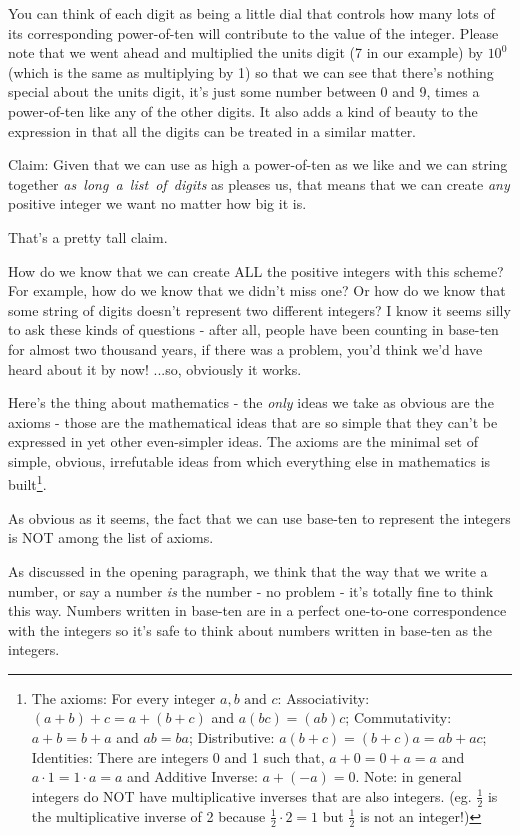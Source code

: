 \documentclass{article}
\begin{document}
You can think of each digit as being a little dial that controls how many lots
of its corresponding power-of-ten will contribute to the value of the integer. Please note
that we went ahead and multiplied the units digit (7 in our example) by $10^0$ (which is the
same as multiplying by 1) so that we can see that there's nothing special about the units digit,
it's just some number between 0 and 9, times a power-of-ten like any of the other digits.
It also adds a kind of beauty to the expression in that all
the digits can be treated in a similar matter.

Claim: Given that we can use as high a power-of-ten as we like
and we can string together \emph{as~long~a~list~of~digits} as pleases us,
that means that we can create \emph{any} positive integer we want no matter how big it is.

That's a pretty tall claim.

How do we know that we can create ALL the positive
integers with this scheme? For example,
how do we know that we didn't miss one? Or how do we know that some string of
digits doesn't represent two different integers? I know it seems silly to ask these kinds of questions - 
after all, people have been counting in base-ten for almost two thousand years,
if there was a problem, you'd think we'd have heard about it by now! ...so, obviously it works.

Here's the thing about mathematics - the \emph{only} ideas we take as obvious
are the axioms - those are the mathematical ideas that are so simple that they can't be expressed in
yet other even-simpler ideas. The axioms are the minimal set of simple, obvious, irrefutable ideas from which
everything else in mathematics is built\footnote{The axioms: For every integer $a,b\text{ and }c$:
Associativity: $(a+b)+c=a+(b+c)$ and $a(bc)=(ab)c$;
Commutativity: $a+b=b+a$ and $ab=ba$;
Distributive: $a(b+c)=(b+c)a=ab+ac$;
Identities: There are integers 0 and 1 such that, $a+0=0+a=a$ and $a\cdot{}1=1\cdot{}a=a$ and
Additive Inverse: $a+(-a)=0$. Note: in general integers do NOT have multiplicative inverses 
that are also integers. (eg. $\frac{1}{2}$ is the multiplicative inverse of 2 because $\frac{1}{2}\cdot{}2=1$ but  $\frac{1}{2}$ is not an integer!)}.

As obvious as it seems, the fact that
we can use base-ten to represent the integers is NOT among the list of axioms.

As discussed in the opening paragraph, we think that the way
that we write a number, or say a number \emph{is} the number - no problem - it's totally fine to think this way.
Numbers written in base-ten are in
a perfect one-to-one correspondence with the integers so it's safe to think about numbers written 
in base-ten as the integers.
\end{document}
